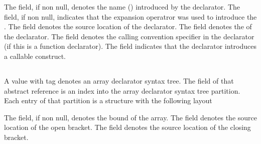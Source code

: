 The  field, if non null, denotes the name () introduced by the declarator.
The  field, if non null, indicates that the expansion operatror  was used to introduce the .
The  field denotes the source location of the declarator.
The  field denotes the  of the declarator.
The  field denotes the calling convention specifier in the declarator (if this is a function declarator).
The  field indicates that the declarator introduces a callable construct.




\subsection{}
\label{sec:ifc:SyntaxSort:PointerDeclarator}

\begin{figure}[H]
	\centering
	\label{fig:ifc:SyntaxSort:PointerDeclarator}
\end{figure}


\subsection{}
\label{sec:ifc:SyntaxSort:ArrayDeclarator}

A  value with tag  denotes an array declarator syntax tree.
The  field of that abstract reference is an index into the array declarator syntax tree partition.
Each entry of that partition is a structure with the following layout
%
\begin{figure}[H]
	\centering
	\label{fig:ifc:SyntaxSort:ArrayDeclarator}
\end{figure}
%
The  field, if non null, denotes the bound of the array.
The  field denotes the source location of the open bracket.
The  field denotes the source location of the closing bracket.

